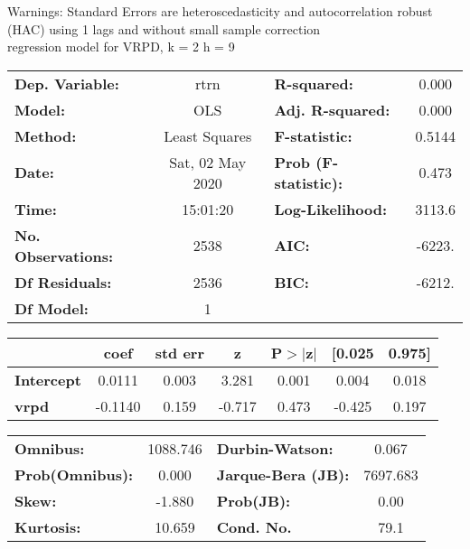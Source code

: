 Warnings: \newline
 [1] Standard Errors are heteroscedasticity and autocorrelation robust (HAC) using 1 lags and without small sample correction\\ 

regression model for VRPD, k = 2 h = 9\begin{center}
\begin{tabular}{lclc}
\toprule
\textbf{Dep. Variable:}    &       rtrn       & \textbf{  R-squared:         } &     0.000   \\
\textbf{Model:}            &       OLS        & \textbf{  Adj. R-squared:    } &     0.000   \\
\textbf{Method:}           &  Least Squares   & \textbf{  F-statistic:       } &    0.5144   \\
\textbf{Date:}             & Sat, 02 May 2020 & \textbf{  Prob (F-statistic):} &    0.473    \\
\textbf{Time:}             &     15:01:20     & \textbf{  Log-Likelihood:    } &    3113.6   \\
\textbf{No. Observations:} &        2538      & \textbf{  AIC:               } &    -6223.   \\
\textbf{Df Residuals:}     &        2536      & \textbf{  BIC:               } &    -6212.   \\
\textbf{Df Model:}         &           1      & \textbf{                     } &             \\
\bottomrule
\end{tabular}
\begin{tabular}{lcccccc}
                   & \textbf{coef} & \textbf{std err} & \textbf{z} & \textbf{P$> |$z$|$} & \textbf{[0.025} & \textbf{0.975]}  \\
\midrule
\textbf{Intercept} &       0.0111  &        0.003     &     3.281  &         0.001        &        0.004    &        0.018     \\
\textbf{vrpd}      &      -0.1140  &        0.159     &    -0.717  &         0.473        &       -0.425    &        0.197     \\
\bottomrule
\end{tabular}
\begin{tabular}{lclc}
\textbf{Omnibus:}       & 1088.746 & \textbf{  Durbin-Watson:     } &    0.067  \\
\textbf{Prob(Omnibus):} &   0.000  & \textbf{  Jarque-Bera (JB):  } & 7697.683  \\
\textbf{Skew:}          &  -1.880  & \textbf{  Prob(JB):          } &     0.00  \\
\textbf{Kurtosis:}      &  10.659  & \textbf{  Cond. No.          } &     79.1  \\
\bottomrule
\end{tabular}
\end{center}

